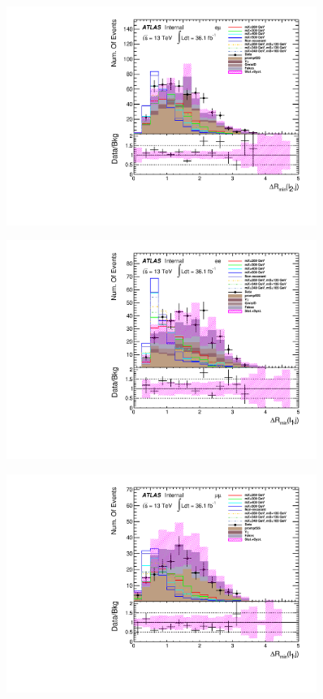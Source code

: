 \begin{figure}[h]
\begin{minipage}[t]{0.33\linewidth}
 \end{minipage}
 \begin{minipage}[t]{0.33\linewidth}
 \centering
 \includegraphics[width=0.9\textwidth,angle=-90]{fig/dataMC_high_Njet_CR/mindR_l2j_emu.pdf}\label{fig:dataMC_high_Njet_CR:mindRl2j_emu.pdf}
 \end{minipage}
 \begin{minipage}[t]{0.33\linewidth}
 \centering
 \includegraphics[width=0.9\textwidth,angle=-90]{fig/dataMC_high_Njet_CR/mindR_l1j_ee.pdf}\label{fig:dataMC_high_Njet_CR:mindRl1j_ee.pdf}
 \end{minipage}
 \begin{minipage}[t]{0.33\linewidth}
 \centering
 \includegraphics[width=0.9\textwidth,angle=-90]{fig/dataMC_high_Njet_CR/mindR_l1j_mumu.pdf}\label{fig:dataMC_high_Njet_CR:mindRl1j_mumu.pdf}

\end{minipage}
\end{figure}
